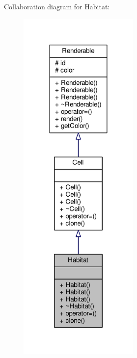 Collaboration diagram for Habitat\+:
\nopagebreak
\begin{figure}[H]
\begin{center}
\leavevmode
\includegraphics[width=167pt]{classHabitat__coll__graph}
\end{center}
\end{figure}
